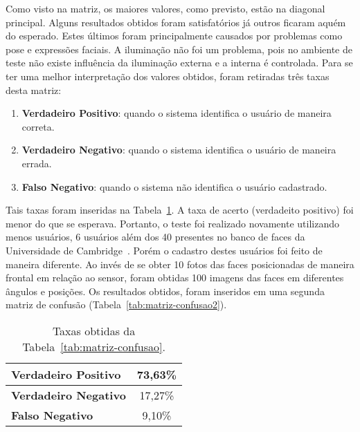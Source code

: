 	Como visto na matriz, os maiores valores, como previsto, estão na diagonal
	principal. Alguns resultados obtidos foram satisfatórios já outros ficaram
	aquém do esperado. Estes últimos foram principalmente causados por problemas como pose e expressões faciais. A iluminação não foi um problema,
	pois no ambiente de teste não existe influência da iluminação externa e a
	interna é controlada. Para se ter uma melhor interpretação dos valores obtidos,
	foram retiradas três taxas desta matriz:

	\begin{enumerate}
		\item \textbf{Verdadeiro Positivo}: quando o sistema identifica o usuário de maneira correta.
		\item \textbf{Verdadeiro Negativo}: quando o sistema identifica o usuário de maneira errada.
		\item \textbf{Falso Negativo}: quando o sistema não identifica o usuário cadastrado.
	\end{enumerate}

	Tais taxas foram inseridas na Tabela~\ref{tab:taxas}. A taxa de acerto
	(verdadeito positivo) foi menor do que se esperava. Portanto, o teste foi
	realizado novamente utilizando menos usuários, 6 usuários além dos 40
	presentes no banco de faces da Universidade de
	Cambridge~\cite{cambridgeFaceDb}. Porém o cadastro destes usuários foi feito
	de maneira diferente. Ao invés de se obter 10 fotos das faces posicionadas de
	maneira frontal em relação ao sensor, foram obtidas 100 imagens das faces em
	diferentes ângulos e posições. Os resultados obtidos, foram inseridos em uma
	segunda matriz de confusão (Tabela~\ref{tab:matriz-confusao2}).

	\begin{table}[H]
		\begin{center}
			\caption{Taxas obtidas da Tabela~\ref{tab:matriz-confusao}.}
			\label{tab:taxas}
			\begin{tabular}{|l|c|}
				\hline \bf Verdadeiro Positivo & 73,63\% \\
				\hline \bf Verdadeiro Negativo & 17,27\% \\
				\hline \bf Falso Negativo & 9,10\% \\
				\hline
			\end{tabular}
		\end{center}
	\end{table}


